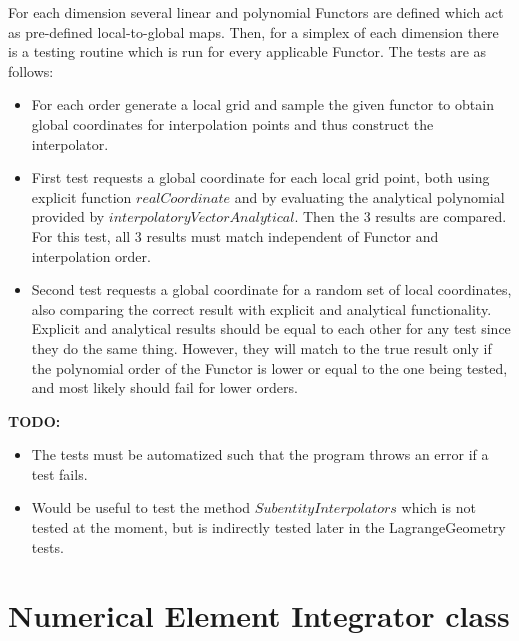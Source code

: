 \documentclass[12pt]{article}
\begin{document}
\noindent
For each dimension several linear and polynomial Functors are defined which act as pre-defined local-to-global maps. Then, for a simplex of each dimension there is a testing routine which is run for every applicable Functor. The tests are as follows:
\begin{itemize}
	\item For each order generate a local grid and sample the given functor to obtain global coordinates for interpolation points and thus construct the interpolator.
	\item First test requests a global coordinate for each local grid point, both using explicit function $realCoordinate$ and by evaluating the analytical polynomial provided by $interpolatoryVectorAnalytical$. Then the 3 results are compared. For this test, all 3 results must match independent of Functor and interpolation order.
	\item Second test requests a global coordinate for a random set of local coordinates, also comparing the correct result with explicit and analytical functionality. Explicit and analytical results should be equal to each other for any test since they do the same thing. However, they will match to the true result only if the polynomial order of the Functor is lower or equal to the one being tested, and most likely should fail for lower orders.
\end{itemize}

\textbf{TODO:}
\begin{itemize}
	\item The tests must be automatized such that the program throws an error if a test fails.
	\item Would be useful to test the method $SubentityInterpolators$ which is not tested at the moment, but is indirectly tested later in the LagrangeGeometry tests.
\end{itemize}



\section{Numerical Element Integrator class}
\end{document}

